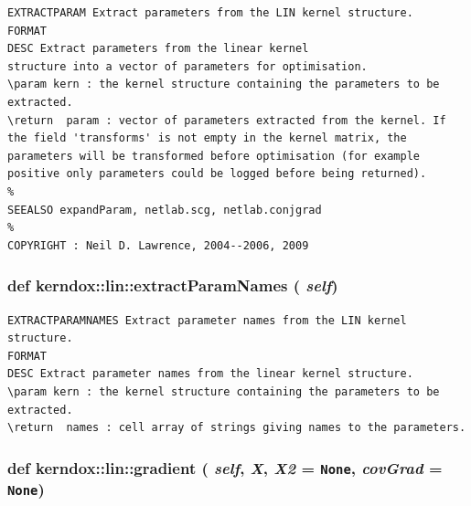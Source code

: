 \footnotesize\begin{verbatim}EXTRACTPARAM Extract parameters from the LIN kernel structure.
FORMAT
DESC Extract parameters from the linear kernel
structure into a vector of parameters for optimisation.
\param kern : the kernel structure containing the parameters to be
extracted.
\return  param : vector of parameters extracted from the kernel. If
the field 'transforms' is not empty in the kernel matrix, the
parameters will be transformed before optimisation (for example
positive only parameters could be logged before being returned).
%
SEEALSO expandParam, netlab.scg, netlab.conjgrad
%
COPYRIGHT : Neil D. Lawrence, 2004--2006, 2009

\end{verbatim}
\normalsize
 \hypertarget{classkerndox_1_1lin_b9112aeafa2c481061e7fa517714ee7b}{
\subsubsection[{extractParamNames}]{\setlength{\rightskip}{0pt plus 5cm}def kerndox::lin::extractParamNames ( {\em self})}}
\label{classkerndox_1_1lin_b9112aeafa2c481061e7fa517714ee7b}




\footnotesize\begin{verbatim}EXTRACTPARAMNAMES Extract parameter names from the LIN kernel structure.
FORMAT
DESC Extract parameter names from the linear kernel structure.
\param kern : the kernel structure containing the parameters to be
extracted.
\return  names : cell array of strings giving names to the parameters.\end{verbatim}
\normalsize
 \hypertarget{classkerndox_1_1lin_9681d3870e1bae2e62507c08f5868818}{
\subsubsection[{gradient}]{\setlength{\rightskip}{0pt plus 5cm}def kerndox::lin::gradient ( {\em self}, \/   {\em X}, \/   {\em X2} = {\tt None}, \/   {\em covGrad} = {\tt None})}}
\label{classkerndox_1_1lin_9681d3870e1bae2e62507c08f5868818}




